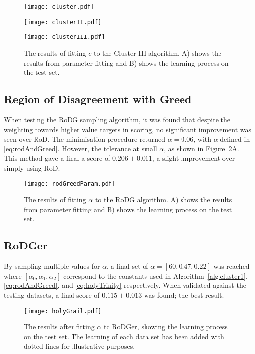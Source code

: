 \begin{figure}[H]
  \begin{center}
    \texttt{[image: cluster.pdf]}
  \end{center}
\end{figure}
\begin{figure}[H]
  \begin{center}
    \texttt{[image: clusterII.pdf]}
  \end{center}
\end{figure}
\begin{figure}[H]
  \begin{center}
    \texttt{[image: clusterIII.pdf]}
    \caption[Cluster III]{The results of fitting $c$ to the Cluster III algorithm. A) shows the results from parameter fitting and B) shows the learning process on the test set.}
    \label{fig:clusterTest}
  \end{center}
\end{figure}

\subsection{Region of Disagreement with Greed}
When testing the RoDG sampling algorithm, it was found that despite the weighting towards higher value targets in scoring, no significant improvement was seen over RoD. The minimisation procedure returned ${\alpha{}=0.06}$, with $\alpha$ defined in \ref{eq:rodAndGreed}. However, the tolerance at small $\alpha$, as shown in Figure~\ref{fig:rogreed}A. This method gave a final a score of ${0.206\pm{}0.011}$, a slight improvement over simply using RoD.

\begin{figure}[H]
  \begin{center}
    \texttt{[image: rodGreedParam.pdf]}
    \caption[RoD with Greed]{The results of fitting $\alpha{}$ to the RoDG algorithm. A) shows the results from parameter fitting and B) shows the learning process on the test set.}
    \label{fig:rogreed}
  \end{center}
\end{figure}

\subsection{RoDGer}
By sampling multiple values for $\alpha$, a final set of $\alpha=[60, 0.47, 0.22]$ was reached where $[\alpha{}_0, \alpha{}_1, \alpha{}_2]$ correspond to the constants used in Algorithm~\ref{alg:cluster1}, \ref{eq:rodAndGreed}, and \ref{eq:holyTrinity} respectively. When validated against the testing datasets, a final score of $0.115\pm{}0.013$ was found; the best result.

\begin{figure}[H]
  \begin{center}
    \texttt{[image: holyGrail.pdf]}
    \caption[RoDGer Test Results]{The results after fitting $\alpha{}$ to RoDGer, showing the learning process on the test set. The learning of each data set has been added with dotted lines for illustrative purposes.}
    \label{fig:holyTrinity}
  \end{center}
\end{figure}

